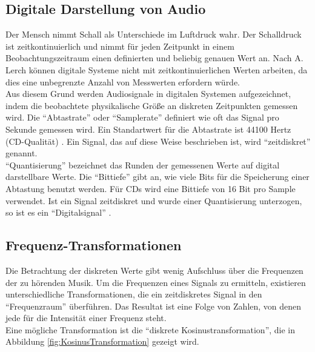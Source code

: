 \documentclass[11pt,a4paper]{article}
\begin{document}
\subsection{Digitale Darstellung von Audio}
Der Mensch nimmt Schall als Unterschiede im Luftdruck wahr. Der Schalldruck ist zeitkontinuierlich und nimmt für jeden Zeitpunkt in einem Beobachtungszeitraum einen definierten und beliebig genauen Wert an. Nach A. Lerch \cite[S. 9]{lerch2012introduction} können digitale Systeme nicht mit zeitkontinuierlichen Werten arbeiten, da dies eine unbegrenzte Anzahl von Messwerten erfordern würde.\\
Aus diesem Grund werden Audiosignale in digitalen Systemen aufgezeichnet, indem die beobachtete physikalische Größe an diskreten Zeitpunkten gemessen wird. Die ``Abtastrate'' oder ``Samplerate'' definiert wie oft das Signal pro Sekunde gemessen wird. Ein Standartwert für die Abtastrate ist 44100 Hertz (CD-Qualität) \cite[S. 4]{lerch2012introduction}.  Ein Signal, das auf diese Weise beschrieben ist, wird ``zeitdiskret'' genannt.\\
``Quantisierung'' bezeichnet das Runden der gemessenen Werte auf digital darstellbare Werte. Die ``Bittiefe'' gibt an, wie viele Bits für die Speicherung einer Abtastung benutzt werden. Für CDs wird eine Bittiefe von 16 Bit pro Sample verwendet. Ist ein Signal zeitdiskret und wurde einer Quantisierung unterzogen, so ist es ein ``Digitalsignal'' \cite[S. 10]{kammeyer2013digitale}.

\subsection{Frequenz-Transformationen}
Die Betrachtung der diskreten Werte gibt wenig Aufschluss über die Frequenzen der zu hörenden Musik. Um die Frequenzen eines Signals zu ermitteln, existieren unterschiedliche Transformationen, die ein zeitdiskretes Signal in den ``Frequenzraum'' überführen. Das Resultat ist eine Folge von Zahlen, von denen jede für die Intensität einer Frequenz steht.\\
Eine mögliche Transformation ist die ``diskrete Kosinustransformation'', die in Abbildung \ref{fig:KosinusTransformation} gezeigt wird.
\end{document}

